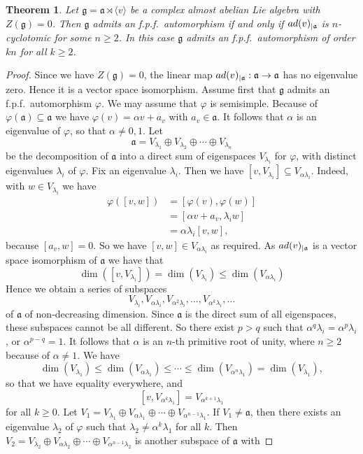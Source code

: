 \documentclass[10pt,a4paper]{amsart}
\newtheorem{thm}{Theorem}
\newcommand{\La}{\mathfrak{a}}
\newcommand{\Lg}{\mathfrak{g}}
\newcommand{\ad}{{\rm ad}}
\newcommand{\al}{\alpha}
\newcommand{\la}{\lambda}
\renewcommand{\phi}{\varphi}
\newcommand{\ra}{\rightarrow}
\begin{document}
\begin{thm}\label{5.4}
Let $\Lg=\La\rtimes \langle v\rangle$ be a complex almost abelian Lie algebra with $Z(\Lg)=0$. Then
$\Lg$ admits an f.p.f.\ automorphism if and only if $\ad(v)_{\mid \La}$ is $n$-cyclotomic for some
$n\ge 2$. In this case $\Lg$ admits an f.p.f.\ automorphism of order $kn$ for all $k\ge 2$.
\end{thm}  

\begin{proof}
Since we have $Z(\Lg)=0$, the linear map $\ad(v)_{\mid \La}: \La\ra \La$ has no eigenvalue zero. Hence it is a
vector space isomorphism. Assume first that $\Lg$ admits an f.p.f.\ automorphism $\phi$. We may assume that $\phi$
is semisimple. Because of $\phi(\La)\subseteq \La$ we have $\phi(v)=\al v+a_v$ with $a_v\in \La$.
It follows that $\al$ is an eigenvalue of $\phi$, so that $\al\neq 0,1$. Let
\[
\La=V_{\la_1}\oplus V_{\la_2}\oplus \cdots \oplus V_{\la_n}
\]
be the decomposition of $\La$ into a direct sum of eigenspaces $V_{\la_i}$ for $\phi$, with distinct eigenvalues
$\la_i$ of $\phi$. Fix an eigenvalue $\la_i$. Then we have $[v,V_{\la_i}]\subseteq V_{\al\la_i}$. Indeed, with
$w\in V_{\la_i}$ we have
\begin{align*}
\phi([v,w]) & =[\phi(v),\phi(w)] \\
            & = [\al v +a_v, \la_i w] \\
            & = \al\la_i[v,w],
\end{align*}
because $[a_v,w]=0$. So we have $[v,w]\in V_{\al\la_i}$ as required. As $\ad(v)_{\mid \La}$ is a vector space
isomorphism of $\La$ we have that
\[
\dim ([v,V_{\la_i}])=\dim (V_{\la_i})\le \dim (V_{\al\la_i})
\]
Hence we obtain a series of subspaces
\[
V_{\la_i}, V_{\al\la_i}, V_{\al^2\la_i},\ldots , V_{\al^k\la_i}, \ldots
\]
of $\La$ of non-decreasing dimension. Since $\La$ is the direct sum of all eigenspaces, these
subspaces cannot be all different. So there exist $p>q$ such that $\al^q\la_i=\al^p\la_i$, or
$\al^{p-q}=1$. It follows that $\al$ is an $n$-th primitive root of unity, where $n\ge 2$ because of $\al\neq 1$.
We have
\[
\dim (V_{\la_1})\le \dim (V_{\al\la_1})\le \cdots \le \dim (V_{\al^n\la_1})=\dim (V_{\la_1}),
\]  
so that we have equality everywhere, and
\[
[v,V_{\al^k\la_1}]=V_{\al^{k+1}\la_1}
\]
for all $k\ge 0$. Let $V_1=V_{\la_1}\oplus V_{\al\la_1}\oplus \cdots \oplus V_{\al^{n-1}\la_1}$. If $V_1\neq \La$,
then there exists an eigenvalue $\la_2$ of $\phi$ such that $\la_2\neq \al^k\la_1$ for all $k$. Then
$V_2=V_{\la_2}\oplus V_{\al\la_2}\oplus \cdots \oplus V_{\al^{n-1}\la_2}$ is another subspace of $\La$ with

\end{proof}
\end{document}
